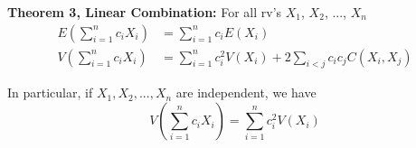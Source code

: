 \documentclass[a4paper,9pt]{extarticle}
\begin{document}
\begin{multicols*}{2}
\textbf{Theorem 3, Linear Combination:} For all rv's $X_1$, $X_2$, ..., $X_n$
\begin{equation}
    \begin{split}
        E(\sum_{i=1}^n c_i X_i) & = \sum_{i=1}^n c_i E(X_i) \\
        V(\sum_{i=1}^n c_i X_i) & = \sum_{i=1}^n c_i^2 V(X_i) + 2 \sum_{i<j} c_i c_j C(X_i, X_j)
    \end{split}
\end{equation}

In particular, if $X_1, X_2, ..., X_n$ are independent, we have
\begin{equation}
    V(\sum_{i=1}^n c_i X_i) = \sum_{i=1}^n c_i^2 V(X_i)
\end{equation}

\end{multicols*}
\end{document}
